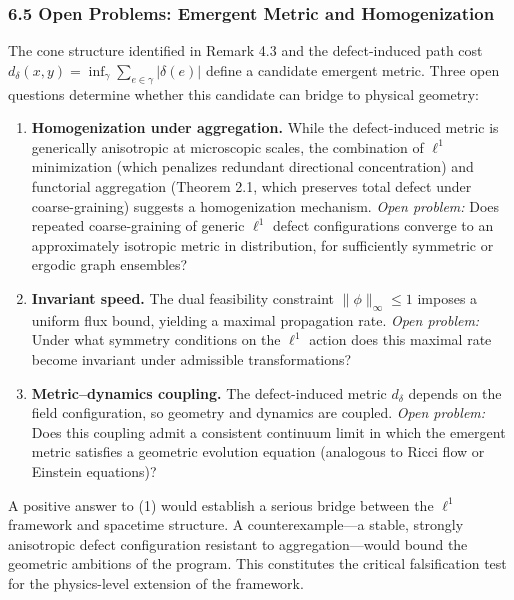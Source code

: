 \documentclass[
]{article}
\begin{document}
\subsubsection{6.5 Open Problems: Emergent Metric and
Homogenization}\label{open-problems-emergent-metric-and-homogenization}

The cone structure identified in Remark 4.3 and the defect-induced path
cost \(d_\delta(x,y) = \inf_\gamma \sum_{e \in \gamma} |\delta(e)|\)
define a candidate emergent metric. Three open questions determine
whether this candidate can bridge to physical geometry:

\begin{enumerate}
\def\labelenumi{\arabic{enumi}.}
\item
  \textbf{Homogenization under aggregation.} While the defect-induced
  metric is generically anisotropic at microscopic scales, the
  combination of \(\ell^1\) minimization (which penalizes redundant
  directional concentration) and functorial aggregation (Theorem 2.1,
  which preserves total defect under coarse-graining) suggests a
  homogenization mechanism. \emph{Open problem:} Does repeated
  coarse-graining of generic \(\ell^1\) defect configurations converge
  to an approximately isotropic metric in distribution, for sufficiently
  symmetric or ergodic graph ensembles?
\item
  \textbf{Invariant speed.} The dual feasibility constraint
  \(\|\phi\|_\infty \le 1\) imposes a uniform flux bound, yielding a
  maximal propagation rate. \emph{Open problem:} Under what symmetry
  conditions on the \(\ell^1\) action does this maximal rate become
  invariant under admissible transformations?
\item
  \textbf{Metric--dynamics coupling.} The defect-induced metric
  \(d_\delta\) depends on the field configuration, so geometry and
  dynamics are coupled. \emph{Open problem:} Does this coupling admit a
  consistent continuum limit in which the emergent metric satisfies a
  geometric evolution equation (analogous to Ricci flow or Einstein
  equations)?
\end{enumerate}

A positive answer to (1) would establish a serious bridge between the
\(\ell^1\) framework and spacetime structure. A counterexample---a
stable, strongly anisotropic defect configuration resistant to
aggregation---would bound the geometric ambitions of the program. This
constitutes the critical falsification test for the physics-level
extension of the framework.
\end{document}
